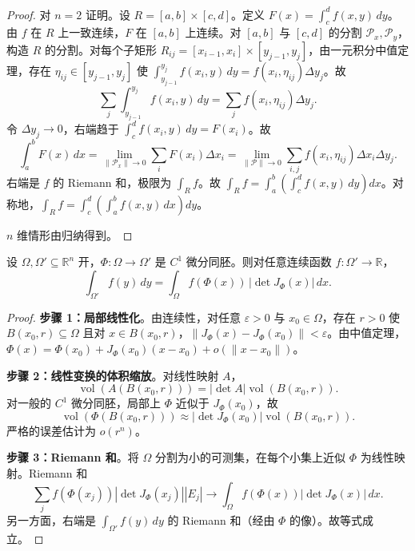 \begin{proof}
对 $n = 2$ 证明。设 $R = [a, b] \times [c, d]$。定义 $F(x) = \int_c^d f(x, y) \, dy$。由 $f$ 在 $R$ 上一致连续，$F$ 在 $[a, b]$ 上连续。对 $[a, b]$ 与 $[c, d]$ 的分割 $\mathcal{P}_x, \mathcal{P}_y$，构造 $R$ 的分割。对每个子矩形 $R_{ij} = [x_{i-1}, x_i] \times [y_{j-1}, y_j]$，由一元积分中值定理，存在 $\eta_{ij} \in [y_{j-1}, y_j]$ 使 $\int_{y_{j-1}}^{y_j} f(x_i, y) \, dy = f(x_i, \eta_{ij}) \Delta y_j$。故
\[
\sum_j \int_{y_{j-1}}^{y_j} f(x_i, y) \, dy = \sum_j f(x_i, \eta_{ij}) \Delta y_j.
\]
令 $\Delta y_j \to 0$，右端趋于 $\int_c^d f(x_i, y) \, dy = F(x_i)$。故
\[
\int_a^b F(x) \, dx = \lim_{\|\mathcal{P}_x\| \to 0} \sum_i F(x_i) \Delta x_i = \lim_{\|\mathcal{P}\| \to 0} \sum_{i,j} f(x_i, \eta_{ij}) \Delta x_i \Delta y_j.
\]
右端是 $f$ 的 Riemann 和，极限为 $\int_R f$。故 $\int_R f = \int_a^b \left( \int_c^d f(x, y) \, dy \right) dx$。对称地，$\int_R f = \int_c^d \left( \int_a^b f(x, y) \, dx \right) dy$。

$n$ 维情形由归纳得到。
\end{proof}

\begin{theorem}[变量代换公式]\label{thm:change_of_variables_ra}
设 $\Omega, \Omega' \subseteq \mathbb{R}^n$ 开，$\Phi: \Omega \to \Omega'$ 是 $C^1$ 微分同胚。则对任意连续函数 $f: \Omega' \to \mathbb{R}$，
\[
\int_{\Omega'} f(y) \, dy = \int_{\Omega} f(\Phi(x)) \, |\det J_\Phi(x)| \, dx.
\]
\end{theorem}

\begin{proof}
\textbf{步骤 1：局部线性化}。由连续性，对任意 $\varepsilon > 0$ 与 $x_0 \in \Omega$，存在 $r > 0$ 使 $B(x_0, r) \subseteq \Omega$ 且对 $x \in B(x_0, r)$，$\|J_\Phi(x) - J_\Phi(x_0)\| < \varepsilon$。由中值定理，$\Phi(x) = \Phi(x_0) + J_\Phi(x_0)(x - x_0) + o(\|x - x_0\|)$。

\textbf{步骤 2：线性变换的体积缩放}。对线性映射 $A$，
\[
\operatorname{vol}(A(B(x_0, r))) = |\det A| \operatorname{vol}(B(x_0, r)).
\]
对一般的 $C^1$ 微分同胚，局部上 $\Phi$ 近似于 $J_\Phi(x_0)$，故
\[
\operatorname{vol}(\Phi(B(x_0, r))) \approx |\det J_\Phi(x_0)| \operatorname{vol}(B(x_0, r)).
\]
严格的误差估计为 $o(r^n)$。

\textbf{步骤 3：Riemann 和}。将 $\Omega$ 分割为小的可测集，在每个小集上近似 $\Phi$ 为线性映射。Riemann 和
\[
\sum_j f(\Phi(x_j)) |\det J_\Phi(x_j)| |E_j| \to \int_\Omega f(\Phi(x)) |\det J_\Phi(x)| \, dx.
\]
另一方面，右端是 $\int_{\Omega'} f(y) \, dy$ 的 Riemann 和（经由 $\Phi$ 的像）。故等式成立。
\end{proof}

